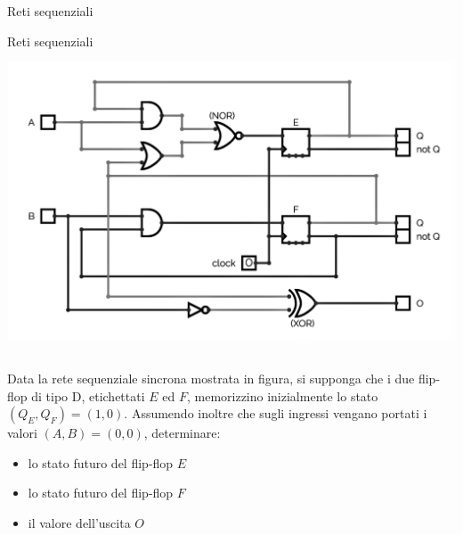 \documentclass[11pt]{article}
\begin{document}
\begin{quiz}{Reti sequenziali}
\begin{cloze}[points=1,shuffle=false]{Reti sequenziali}
    \includegraphics[height=9cm]{figures/seq_2.png}
    
    Data la rete sequenziale sincrona mostrata in figura, si supponga che i due flip-flop di tipo D,
    etichettati $E$ ed $F$, memorizzino inizialmente lo stato $(Q_E,Q_F) = (1,0)$.
    Assumendo inoltre che sugli ingressi vengano portati i valori $(A,B)=(0,0)$,
    determinare:
    
    \begin{itemize}
    \item lo stato futuro del flip-flop $E$ 
    \item lo stato futuro del flip-flop $F$ 
    \item il valore dell'uscita $O$ 
    \end{itemize}
\end{cloze}



\end{quiz}
\end{document}
